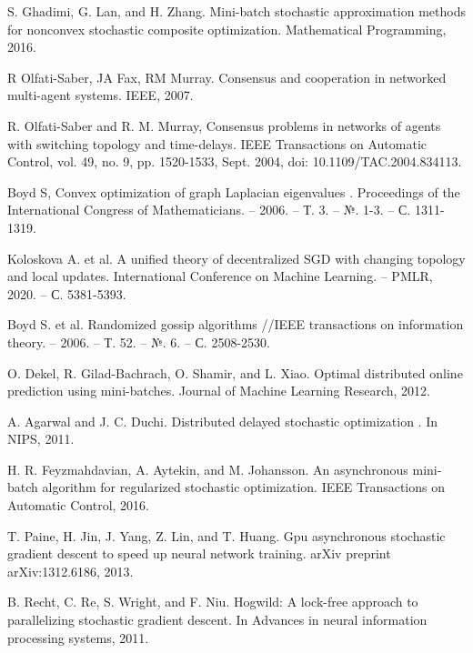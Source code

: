 \documentclass[a4paper,article,14pt]{extarticle}
\begin{document}
\begin{thebibliography}{1}
 S. Ghadimi, G. Lan, and H. Zhang. \flqq Mini-batch stochastic approximation methods for nonconvex stochastic composite optimization\frqq. Mathematical Programming, 2016.

 R Olfati-Saber, JA Fax, RM Murray. \flqq Consensus and cooperation in networked multi-agent systems\frqq. IEEE, 2007.

 R. Olfati-Saber and R. M. Murray, \flqq Consensus problems in networks of agents with switching topology and time-delays\frqq. IEEE Transactions on Automatic Control, vol. 49, no. 9, pp. 1520-1533, Sept. 2004, doi: 10.1109/TAC.2004.834113.

 Boyd S, \flqq Convex optimization of graph Laplacian eigenvalues \frqq. Proceedings of the International Congress of Mathematicians. – 2006. – Т. 3. – №. 1-3. – С. 1311-1319.

 Koloskova A. et al. \flqq A unified theory of decentralized SGD with changing topology and local updates\frqq. International Conference on Machine Learning. – PMLR, 2020. – С. 5381-5393.

 Boyd S. et al. \flqq Randomized gossip algorithms //IEEE transactions on information theory\frqq. – 2006. – Т. 52. – №. 6. – С. 2508-2530.

 O. Dekel, R. Gilad-Bachrach, O. Shamir, and L. Xiao. \flqq Optimal distributed online prediction using mini-batches\frqq. Journal of Machine Learning Research, 2012.

 A. Agarwal and J. C. Duchi. \flqq Distributed delayed stochastic optimization \frqq. In NIPS, 2011.

 H. R. Feyzmahdavian, A. Aytekin, and M. Johansson. \flqq An asynchronous mini-batch algorithm for regularized stochastic optimization\frqq. IEEE Transactions on Automatic Control, 2016.

 T. Paine, H. Jin, J. Yang, Z. Lin, and T. Huang. \flqq Gpu asynchronous stochastic gradient descent to speed up neural network training\frqq. arXiv preprint arXiv:1312.6186, 2013.

 B. Recht, C. Re, S. Wright, and F. Niu. Hogwild: \flqq A lock-free approach to parallelizing stochastic gradient descent\frqq. In Advances in neural information processing systems, 2011.


\end{thebibliography}
\end{document}
